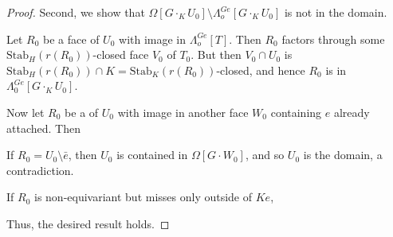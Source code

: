\documentclass[a4paper,10pt,draft]{article}%
\numberwithin{equation}{section}%
\begin{document}
\begin{proof}
      Second, we show that $\Omega[G \cdot_K U_0] \setminus \Lambda^{G e}_o[G \cdot_K U_0]$ is not in the domain.
      \begin{enumerate*}[label=(\itshape\roman*\upshape)]
      \item Let $R_0$ be a face of $U_0$ with image in $\Lambda^{G e}_o[T]$.
            Then $R_0$ factors through some $\mathrm{Stab}_H(r(R_0))$-closed face $V_0$ of $T_0$.
            But then $V_0 \cap U_0$ is $\mathrm{Stab}_H(r(R_0)) \cap K = \mathrm{Stab}_K(r(R_0))$-closed,
            and hence $R_0$ is in $\Lambda^{G e}_0[G \cdot_K U_0]$.
      \item Now let $R_0$ be a of $U_0$ with image in another face $W_0$ containing $e$ already attached. Then
            \begin{enumerate*}
            \item If $R_0 = U_0 \setminus \bar e$, then 
                  $U_0$ is contained in $\Omega[G \cdot W_0]$, and so $U_0$ is the domain, a contradiction.
            \item If $R_0$ is non-equivariant but misses only outside of $K e$, 
            \end{enumerate*}
      \end{enumerate*}
      Thus, the desired result holds.
\end{proof}
\end{document}
